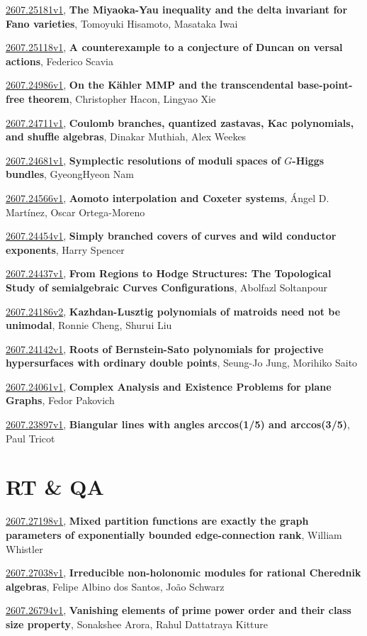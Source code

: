 \documentclass[9pt, a4paper]{article}
\theoremstyle{plain}
\theoremstyle{definition}
\theoremstyle{remark}
\newcommand{\arxiv}[3]{\href{https://arxiv.org/abs/#1}{#1}, \textbf{\textcolor{arxivblue}{#2}}, #3}
\begin{document}
\arxiv{2607.25181v1}{The Miyaoka-Yau inequality and the delta invariant for Fano varieties}{Tomoyuki Hisamoto, Masataka Iwai}

\arxiv{2607.25118v1}{A counterexample to a conjecture of Duncan on versal actions}{Federico Scavia}

\arxiv{2607.24986v1}{On the Kähler MMP and the transcendental base-point-free theorem}{Christopher Hacon, Lingyao Xie}

\arxiv{2607.24711v1}{Coulomb branches, quantized zastavas, Kac polynomials, and shuffle algebras}{Dinakar Muthiah, Alex Weekes}

\arxiv{2607.24681v1}{Symplectic resolutions of moduli spaces of $G$-Higgs bundles}{GyeongHyeon Nam}

\arxiv{2607.24566v1}{Aomoto interpolation and Coxeter systems}{Ángel D. Martínez, Oscar Ortega-Moreno}

\arxiv{2607.24454v1}{Simply branched covers of curves and wild conductor exponents}{Harry Spencer}

\arxiv{2607.24437v1}{From Regions to Hodge Structures: The Topological Study of semialgebraic Curves Configurations}{Abolfazl Soltanpour}

\arxiv{2607.24186v2}{Kazhdan-Lusztig polynomials of matroids need not be unimodal}{Ronnie Cheng, Shurui Liu}

\arxiv{2607.24142v1}{Roots of Bernstein-Sato polynomials for projective hypersurfaces with ordinary double points}{Seung-Jo Jung, Morihiko Saito}

\arxiv{2607.24061v1}{Complex Analysis and Existence Problems for plane Graphs}{Fedor Pakovich}

\arxiv{2607.23897v1}{Biangular lines with angles arccos(1/5) and arccos(3/5)}{Paul Tricot}


\section{RT \& QA}
\arxiv{2607.27198v1}{Mixed partition functions are exactly the graph parameters of exponentially bounded edge-connection rank}{William Whistler}

\arxiv{2607.27038v1}{Irreducible non-holonomic modules for rational Cherednik algebras}{Felipe Albino dos Santos, João Schwarz}

\arxiv{2607.26794v1}{Vanishing elements of prime power order and their class size property}{Sonakshee Arora, Rahul Dattatraya Kitture}
\end{document}
